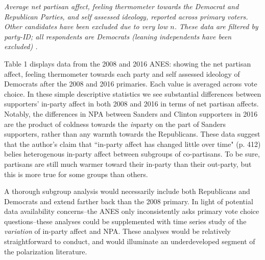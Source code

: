 \documentclass[12pt]{article}
\begin{document}
 \begin{table}[h!]

\caption{\label{table} \textit{Average net partisan affect, feeling thermometer towards the Democrat and Republican Parties, and self assessed ideology, reported across primary voters. Other candidates have been excluded due to very low $n$. These data are filtered by party-ID; all respondents are Democrats (leaning independents have been excluded)
.}}
\end{table}

Table 1 displays data from the 2008 and 2016 ANES: showing the net partisan affect, feeling thermometer towards each party and self assessed ideology of Democrats after the 2008 and 2016 primaries. Each value is averaged across vote choice. In these simple descriptive statistics we see substantial differences between supporters' in-party affect in both 2008 and 2016 in terms of net partisan affects. Notably, the differences in NPA between Sanders and Clinton supporters in 2016 are the product of coldness towards the \textit{in}party on the part of Sanders supporters, rather than any warmth towards the Republicans. These data suggest that the author's claim that ``in-party affect has changed little over time" (p. 412) belies heterogenous in-party affect between subgroups of co-partisans. To be sure, partisans are still much warmer toward their in-party than their out-party, but this is more true for some groups than others. 

A thorough subgroup analysis would necessarily include both Republicans and Democrats and extend farther back than the 2008 primary. In light of potential data availability concerns--the ANES only inconsistently asks primary vote choice questions--these analyses could be supplemented with time series study of the \textit{variation} of in-party affect and NPA. These analyses would be relatively straightforward to conduct, and would illuminate an underdeveloped segment of the polarization literature.




\end{document}
